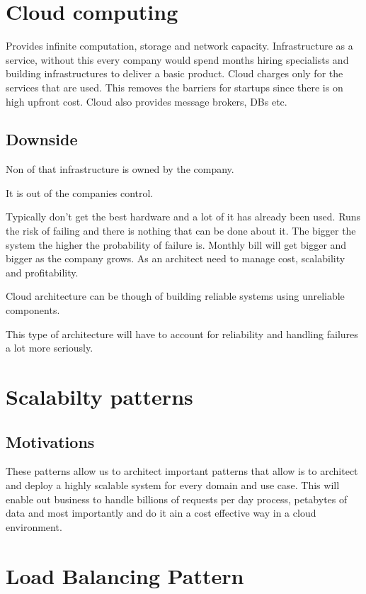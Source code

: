 \documentclass[a4paper, 11pt]{book}
\begin{document}
    \section{Cloud computing}
    Provides infinite computation, storage and network capacity.
    Infrastructure as a service, without this every company would spend months hiring specialists and building infrastructures to deliver a basic product.
    Cloud charges only for the services that are used.
    This removes the barriers for startups since there is on high upfront cost.
    Cloud also provides message brokers, DBs etc.

    \subsection{Downside}
    Non of that infrastructure is owned by the company.

    It is out of the companies control.

    Typically don't get the best hardware and a lot of it has already been used.
    Runs the risk of failing and there is nothing that can be done about it.
    The bigger the system the higher the probability of failure is.
    Monthly bill will get bigger and bigger as the company grows.
    As an architect need to manage cost, scalability and profitability.

    Cloud architecture can be though of building reliable systems using unreliable components.

    This type of architecture will have to account for reliability and handling failures a lot more seriously.

    \section{Scalabilty patterns}

    \subsection{Motivations}
    These patterns allow us to architect important patterns that allow is to architect and deploy a highly scalable system for every domain and use case.
    This will enable out business to handle billions of requests per day process, petabytes of data and most importantly and do it ain a cost effective way in a cloud environment.

    \section{Load Balancing Pattern}
\end{document}

